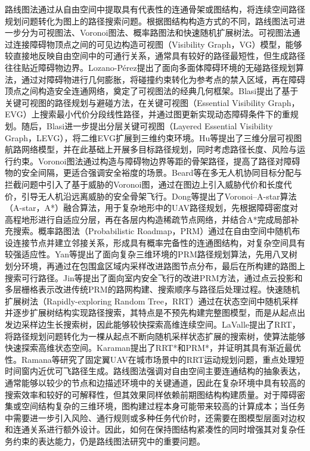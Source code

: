 路线图法通过从自由空间中提取具有代表性的连通骨架或图结构，将连续空间路径规划问题转化为图上的路径搜索问题。根据图结构构造方式的不同，路线图法可进一步分为可视图法、Voronoi图法、概率路图法和快速随机扩展树法。可视图法通过连接障碍物顶点之间的可见边构造可视图（Visibility Graph，VG）模型，能够较直接地反映自由空间中的可通行关系，通常具有较好的路径最短性，但生成路径往往贴近障碍物边界。Lozano-Pérez提出了面向多面体障碍环境的无碰路径规划算法，通过对障碍物进行几何膨胀，将碰撞约束转化为参考点的禁入区域，再在障碍顶点之间构造安全连通网络，奠定了可视图法的经典几何框架\cite{lozano1979algorithm}。Blasi提出了基于关键可视图的路径规划与避碰方法，在关键可视图（Essential Visibility Graph，EVG）上搜索最小代价分段线性路径，并通过图更新实现动态障碍条件下的重规划\cite{blasi2020path}。随后，Blasi进一步提出分层关键可视图（Layered Essential Visibility Graph，LEVG），将二维EVG扩展到三维约束环境\cite{blasi2023uav}。Hu等提出了三维分层可视图航路网络模型，并在此基础上开展多目标路径规划，同时考虑路径长度、风险与运行约束\cite{hu2025research}。Voronoi图法通过构造与障碍物边界等距的骨架路径，提高了路径对障碍物的安全间隔，更适合强调安全裕度的场景。Beard等在多无人机协同目标分配与拦截问题中引入了基于威胁的Voronoi图，通过在图边上引入威胁代价和长度代价，引导无人机沿远离威胁的安全骨架飞行\cite{beard2002coordinated}。Dong等提出了Voronoi--A-star算法（A-star，A*）融合算法，用于复杂地形中的UAV路径规划，先根据障碍密度对高程地形进行自适应分层，再在各层内构造稀疏节点网络，并结合A*完成局部补充搜索\cite{dong2025voronoi}。概率路图法（Probabilistic Roadmap，PRM）通过在自由空间中随机布设连接节点并建立邻接关系，形成具有概率完备性的连通图结构，对复杂空间具有较强适应性\cite{kavraki1996probabilistic}。Yan等提出了面向复杂三维环境的PRM路径规划算法，先用八叉树划分环境，再通过在包围盒区域内采样改进路图节点分布，最后在所构建的路图上搜索可行路径\cite{yan2013path}。Jin等提出了面向室内安全飞行的改进PRM方法，通过点云投影和多层栅格表示改进传统PRM的路网构建、搜索顺序与路径后处理过程\cite{jin2023improved}。快速随机扩展树法（Rapidly-exploring Random Tree，RRT）通过在状态空间中随机采样并逐步扩展树结构实现路径搜索，其特点是不预先构建完整图模型，而是从起点出发边采样边生长搜索树，因此能够较快探索高维连续空间。LaValle提出了RRT，将路径规划问题转化为一棵从起点不断向随机采样状态扩展的搜索树，使算法能够快速探索高维状态空间\cite{lavalle1998rapidly}。Karaman提出了RRT*和PRM*，并证明其具有渐近最优性\cite{karaman2011sampling}。Ramana等研究了固定翼UAV在城市场景中的RRT运动规划问题，重点处理短时间窗内近优可飞路径生成\cite{ramana2016motion}。路线图法强调对自由空间主要连通结构的抽象表达，通常能够以较少的节点和边描述环境中的关键通道，因此在复杂环境中具有较高的搜索效率和较好的可解释性，但其效果同样依赖前期图结构构建质量。对于障碍密集或空间结构复杂的三维环境，图构建过程本身可能带来较高的计算成本；当任务中需要进一步引入风险、通行规则或多种任务代价时，还需要在图模型层面对边权和连通关系进行额外设计。因此，如何在保持图结构紧凑性的同时增强其对复杂任务约束的表达能力，仍是路线图法研究中的重要问题。

